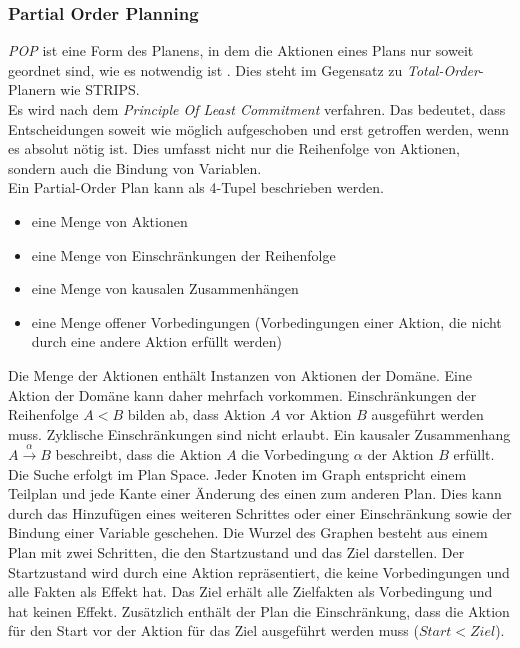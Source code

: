 \subsubsection{Partial Order Planning}{\label{section:pop}}
\emph{\acf{POP}} ist eine Form des Planens, in dem die Aktionen eines Plans nur soweit geordnet sind, wie es notwendig ist \cite{dyer_2003}.
Dies steht im Gegensatz zu \emph{Total-Order}-Planern wie \ac{STRIPS}.\\
Es wird nach dem \emph{Principle Of Least Commitment} verfahren.
Das bedeutet, dass Entscheidungen soweit wie möglich aufgeschoben und erst getroffen werden, wenn es absolut nötig ist.
Dies umfasst nicht nur die Reihenfolge von Aktionen, sondern auch die Bindung von Variablen.\\
Ein Partial-Order Plan kann als 4-Tupel \cite{grastien} beschrieben werden.
\begin{itemize}
    \item eine Menge von Aktionen
    \item eine Menge von Einschränkungen der Reihenfolge
    \item eine Menge von kausalen Zusammenhängen
    \item eine Menge offener Vorbedingungen (Vorbedingungen einer Aktion, die nicht durch eine andere Aktion erfüllt werden)
\end{itemize}
Die Menge der Aktionen enthält Instanzen von Aktionen der Domäne.
Eine Aktion der Domäne kann daher mehrfach vorkommen.
Einschränkungen der Reihenfolge $A < B$ bilden ab, dass Aktion $A$ vor Aktion $B$ ausgeführt werden muss.
Zyklische Einschränkungen sind nicht erlaubt.
Ein kausaler Zusammenhang $A \xrightarrow{\alpha} B$ beschreibt, dass die Aktion $A$ die Vorbedingung $\alpha$ der Aktion $B$ erfüllt.\\
Die Suche erfolgt im Plan Space.
Jeder Knoten im Graph entspricht einem Teilplan und jede Kante einer Änderung des einen zum anderen Plan.
Dies kann durch das Hinzufügen eines weiteren Schrittes oder einer Einschränkung sowie der Bindung einer Variable geschehen.
Die Wurzel des Graphen besteht aus einem Plan mit zwei Schritten, die den Startzustand und das Ziel darstellen.
Der Startzustand wird durch eine Aktion repräsentiert, die keine Vorbedingungen und alle Fakten als Effekt hat.
Das Ziel erhält alle Zielfakten als Vorbedingung und hat keinen Effekt.
Zusätzlich enthält der Plan die Einschränkung, dass die Aktion für den Start vor der Aktion für das Ziel ausgeführt werden muss ($Start < Ziel$).\\
